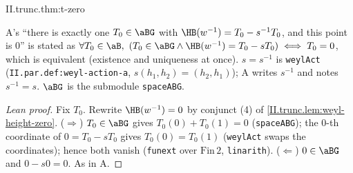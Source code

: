 \begin{theorem}[$T_0=0$]
\end{theorem}
\begin{tfformal}{II.trunc.thm:t-zero}
\begin{tffidelity}
A's ``there is exactly one $T_0\in\aBG$ with $\HB(w^{-1})=T_0-s^{-1}T_0$, and this point is $0$'' is stated as $\forall T_0\in\aB,\ (T_0\in\aBG\wedge\HB(w^{-1})=T_0-sT_0)\iff T_0=0$, which is equivalent (existence and uniqueness at once). $s=s^{-1}$ is \texttt{weylAct} (\texttt{II.par.def:weyl-action-a}, $s(h_1,h_2)=(h_2,h_1)$); A writes $s^{-1}$ and notes $s^{-1}=s$. $\aBG$ is the submodule \texttt{spaceABG}.
\end{tffidelity}
\end{tfformal}
\begin{proof}[Lean proof]
Fix $T_0$. Rewrite $\HB(w^{-1})=0$ by conjunct (4) of \cref{II.trunc.lem:weyl-height-zero}. ($\Rightarrow$) $T_0\in\aBG$ gives $T_0(0)+T_0(1)=0$ (\texttt{spaceABG}); the $0$-th coordinate of $0=T_0-sT_0$ gives $T_0(0)=T_0(1)$ (\texttt{weylAct} swaps the coordinates); hence both vanish (\texttt{funext} over $\mathrm{Fin}\,2$, \texttt{linarith}). ($\Leftarrow$) $0\in\aBG$ and $0-s0=0$. As in A.
\end{proof}

